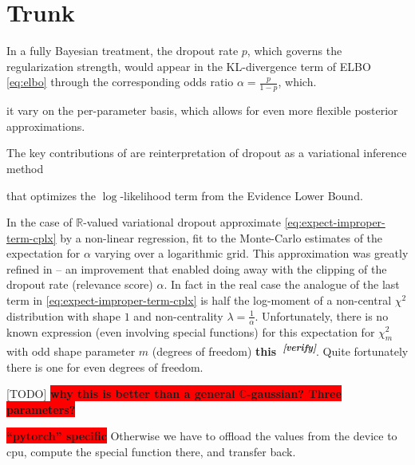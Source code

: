 \documentclass[a4paper,10pt]{article}
\newcommand{\real}{\mathbb{R}}
\newcommand{\cplx}{\mathbb{C}}
\newcommand{\important}[1]{\textbf{\colorbox{red}{#1}}}
\newcommand{\attn}[2]{\textbf{\color{red} #2~\textsuperscript{\textit{[#1]}}}}
\newcommand{\verify}[1]{\attn{verify}{#1}}
\newcommand{\todo}[1]{{\color{blue} [TODO]} \important{#1}}
\begin{document}



\clearpage


\section{Trunk} %
\label{sec:trunk}



In a fully Bayesian treatment, the dropout rate $p$, which governs the regularization strength,
would appear in the KL-divergence term of ELBO \eqref{eq:elbo} through the corresponding odds 
ratio $
  \alpha = \tfrac{p}{1-p}
$, which.

it vary on the per-parameter basis, which allows for even more flexible posterior
approximations.

The key contributions of \cite{kingma_variational_2015} are reinterpretation of dropout
as a variational inference method

that optimizes the $\log$-likelihood term from the Evidence Lower Bound.




In the case of $\real$-valued variational dropout \cite{kingma_variational_2015} approximate
\eqref{eq:expect-improper-term-cplx} by a non-linear regression, fit to the Monte-Carlo estimates
of the expectation for $\alpha$ varying over a logarithmic grid. This approximation was greatly
refined in \cite{molchanov_variational_2017} -- an improvement that enabled doing away with
the clipping of the dropout rate (relevance score) $\alpha$. In fact in the real case the analogue
of the last term in \eqref{eq:expect-improper-term-cplx} is half the log-moment of a non-central
$\chi^2$ distribution with shape $1$ and non-centrality $\lambda = \tfrac1{\alpha}$. Unfortunately,
there is no known expression (even involving special functions) for this expectation for
$\chi^2_m$ with odd shape parameter $m$ (degrees of freedom) \verify{this}. Quite fortunately
there is one for even degrees of freedom.

\todo{why this is better than a general $\cplx$-gaussian? Three parameters?}

\important{``pytorch'' specific}
Otherwise we have to offload the values from the device to cpu, compute the special
function there, and transfer back.
\end{document}
